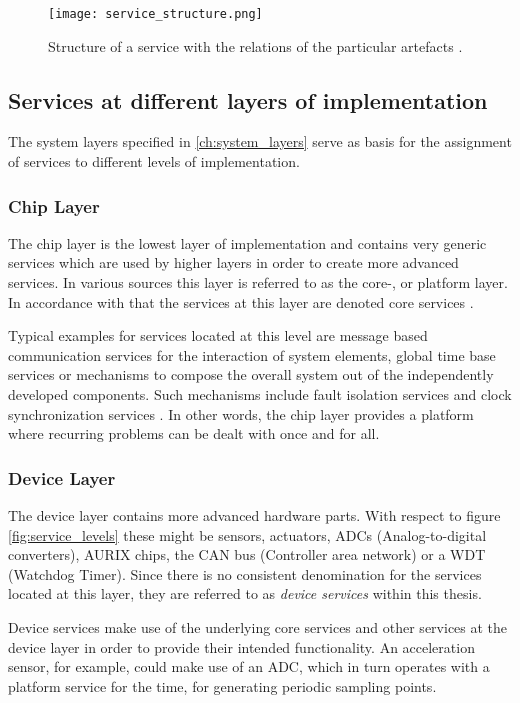 \begin{figure}[!htbp]
\centering
\texttt{[image: service\_structure.png]}
\caption{Structure of a service with the relations of the particular artefacts \cite[p.45]{krafzig}.}
\label{fig:service}
\end{figure}




\subsection{Services at different layers of implementation}
\label{ch:service_layers}
The system layers specified in \ref{ch:system_layers} serve as basis for the assignment of services to different levels of implementation.

\subsubsection{Chip Layer}
The chip layer is the lowest layer of implementation and contains very generic services which are used by higher layers in order to create more advanced services. In various sources this layer is referred to as the core-, or platform layer. In accordance with that the services at this layer are denoted core services \cite[p.44]{genesys}.

Typical examples for services located at this level are message based 
communication services for the interaction of system elements, global time base services or mechanisms to compose the overall system out of the independently developed components. Such mechanisms include fault isolation services and clock synchronization services \cite[p.7-12]{genesys}. In other words, the chip layer provides a platform where recurring problems can be dealt with once and for all.

\subsubsection{Device Layer}
The device layer contains more advanced hardware parts. With respect to figure \ref{fig:service_levels} these might be sensors, actuators, ADCs (Analog-to-digital converters), AURIX chips, the CAN bus (Controller area network) or a WDT (Watchdog Timer). Since there is no consistent denomination for the services located at this layer, they are referred to as \emph{device services} within this thesis.

Device services make use of the underlying core services and other services at the device layer in order to provide their intended functionality. 
An acceleration sensor, for example, could make use of an ADC, which in turn operates with a platform service for the time, for generating periodic sampling points.

